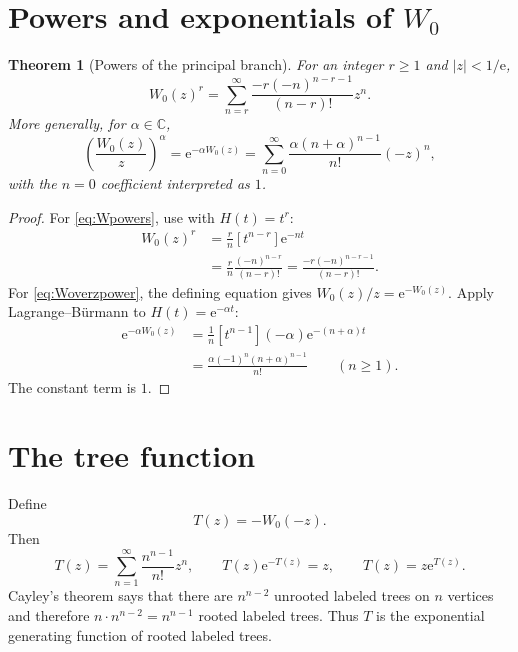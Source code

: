 \documentclass[11pt,oneside]{book}
\newtheorem{theorem}{Theorem}[chapter]
\theoremstyle{definition}
\theoremstyle{remark}
\newcommand{\ee}{\mathrm e}
\newcommand{\C}{\mathbb C}
\begin{document}
\section{Powers and exponentials of $W_0$}

\begin{theorem}[Powers of the principal branch]\label{thm:Wpowers}
For an integer $r\ge1$ and $|z|<1/\ee$,
\begin{equation}\label{eq:Wpowers}
 W_0(z)^r
 =\sum_{n=r}^{\infty}
 \frac{-r(-n)^{n-r-1}}{(n-r)!}z^n.
\end{equation}
More generally, for $\alpha\in\C$,
\begin{equation}\label{eq:Woverzpower}
 \left(\frac{W_0(z)}{z}\right)^\alpha
 =\ee^{-\alpha W_0(z)}
 =\sum_{n=0}^{\infty}
 \frac{\alpha(n+\alpha)^{n-1}}{n!}(-z)^n,
\end{equation}
with the $n=0$ coefficient interpreted as $1$.
\end{theorem}

\begin{proof}
For \eqref{eq:Wpowers}, use  with $H(t)=t^r$:
\begin{align*}
 [z^n]W_0(z)^r
 &=\frac rn[t^{n-r}]\ee^{-nt}\\
 &=\frac rn\frac{(-n)^{n-r}}{(n-r)!}
 =\frac{-r(-n)^{n-r-1}}{(n-r)!}.
\end{align*}
For \eqref{eq:Woverzpower}, the defining equation gives
$W_0(z)/z=\ee^{-W_0(z)}$.  Apply Lagrange--Bürmann to
$H(t)=\ee^{-\alpha t}$:
\begin{align*}
 [z^n]\ee^{-\alpha W_0(z)}
 &=\frac1n[t^{n-1}](-\alpha)\ee^{-(n+\alpha)t}\\
 &=\frac{\alpha(-1)^n(n+\alpha)^{n-1}}{n!}
 \qquad(n\ge1).
\end{align*}
The constant term is $1$.
\end{proof}

\section{The tree function}

Define
\begin{equation}\label{eq:treefunction}
 T(z)=-W_0(-z).
\end{equation}
Then
\begin{equation}\label{eq:Tseries}
 T(z)=\sum_{n=1}^{\infty}\frac{n^{n-1}}{n!}z^n,
 \qquad
 T(z)\ee^{-T(z)}=z,
 \qquad
 T(z)=z\ee^{T(z)}.
\end{equation}
Cayley's theorem says that there are $n^{n-2}$ unrooted labeled trees on
$n$ vertices and therefore $n\cdot n^{n-2}=n^{n-1}$ rooted labeled trees.
Thus $T$ is the exponential generating function of rooted labeled trees.
\end{document}
